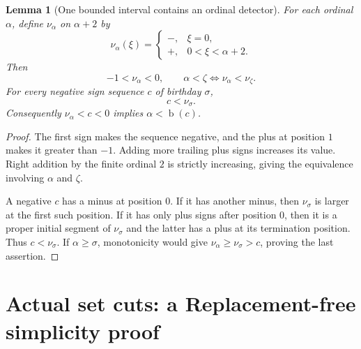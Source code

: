 \documentclass[11pt,letterpaper]{article}
\newtheorem{lemma}[lemma]{Lemma}\aliascntresetthe{lemma}
\theoremstyle{definition}
\theoremstyle{remark}
\newcommand{\bd}{\operatorname{b}}
\begin{document}
\begin{lemma}[One bounded interval contains an ordinal detector]
\label{hset:zr:lem:negativecode}
For each ordinal $\alpha$, define $\nu_\alpha$ on $\alpha+2$ by
\[
\nu_\alpha(\xi)=
\begin{cases}
-,&\xi=0,\\
+,&0<\xi<\alpha+2.
\end{cases}
\]
Then
\[
-1<\nu_\alpha<0,\qquad
\alpha<\zeta\Longleftrightarrow\nu_\alpha<\nu_\zeta.
\]
For every negative sign sequence $c$ of birthday $\sigma$,
\[
c<\nu_\sigma.
\]
Consequently $\nu_\alpha<c<0$ implies $\alpha<\bd(c)$.
\end{lemma}
\begin{proof}
The first sign makes the sequence negative, and the plus at position $1$ makes it greater than $-1$. Adding more trailing plus signs increases its value. Right addition by the finite ordinal $2$ is strictly increasing, giving the equivalence involving $\alpha$ and $\zeta$.

A negative $c$ has a minus at position $0$. If it has another minus, then $\nu_\sigma$ is larger at the first such position. If it has only plus signs after position $0$, then it is a proper initial segment of $\nu_\sigma$ and the latter has a plus at its termination position. Thus $c<\nu_\sigma$. If $\alpha\geq\sigma$, monotonicity would give $\nu_\alpha\geq\nu_\sigma>c$, proving the last assertion.
\end{proof}

\section{Actual set cuts: a Replacement-free simplicity proof}
\label{hset:zr:sec:setcuts}
\end{document}
